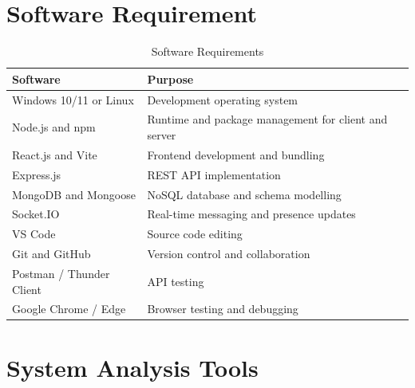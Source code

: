 \documentclass[12pt,a4paper,oneside]{report}
\begin{document}
\section{Software Requirement}
\begin{table}[H]
\centering
\caption{Software Requirements}
\begin{tabularx}{\textwidth}{p{2.3in}Y}
\toprule
\textbf{Software} & \textbf{Purpose} \\
\midrule
Windows 10/11 or Linux & Development operating system \\
Node.js and npm & Runtime and package management for client and server \\
React.js and Vite & Frontend development and bundling \\
Express.js & REST API implementation \\
MongoDB and Mongoose & NoSQL database and schema modelling \\
Socket.IO & Real-time messaging and presence updates \\
VS Code & Source code editing \\
Git and GitHub & Version control and collaboration \\
Postman / Thunder Client & API testing \\
Google Chrome / Edge & Browser testing and debugging \\
\bottomrule
\end{tabularx}
\end{table}

\section{System Analysis Tools}
\end{document}
